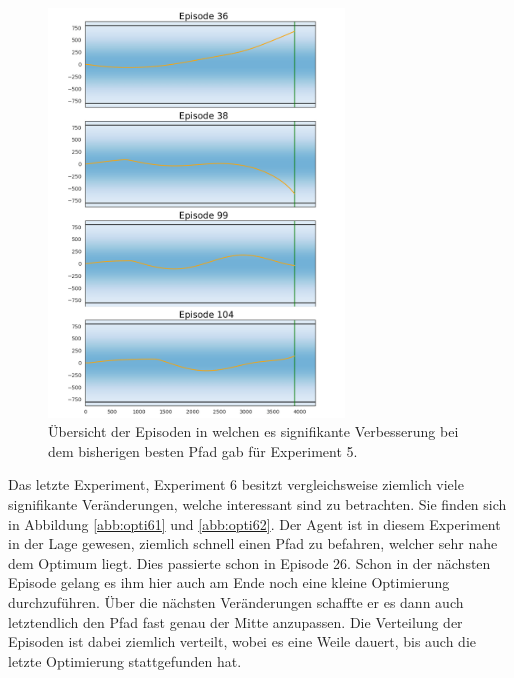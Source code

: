 \documentclass[]{iat}
\begin{document}
\begin{figure}[H]
    \includegraphics[width=0.7\textwidth]{graphics/optimum_s5/optimum_s5.png}
    \centering
    \caption{Übersicht der Episoden in welchen es signifikante Verbesserung bei dem bisherigen besten Pfad gab für Experiment 5.}
    \label{abb:opti5}
\end{figure}
Das letzte Experiment, Experiment 6 besitzt vergleichsweise ziemlich viele signifikante Veränderungen, welche interessant sind zu betrachten. Sie finden sich in Abbildung \ref{abb:opti61} und \ref{abb:opti62}. Der Agent ist in diesem Experiment in der Lage gewesen, ziemlich schnell einen Pfad zu befahren, welcher sehr nahe dem Optimum liegt. Dies passierte schon in Episode 26. Schon in der nächsten Episode gelang es ihm hier auch am Ende noch eine kleine Optimierung durchzuführen. Über die nächsten Veränderungen schaffte er es dann auch letztendlich den Pfad fast genau der Mitte anzupassen. Die Verteilung der Episoden ist dabei ziemlich verteilt, wobei es eine Weile dauert, bis auch die letzte Optimierung stattgefunden hat.
\end{document}
